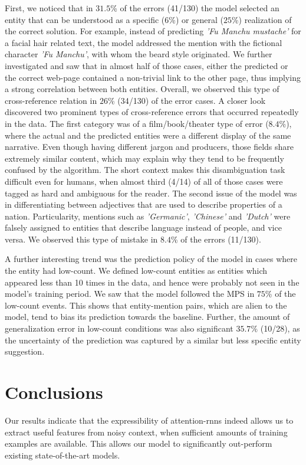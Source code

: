 \documentclass[11pt]{article}
\begin{document}
	First, we noticed that in $31.5$\% of the errors (41/130) the model selected an entity that can be understood as a specific ($6$\%) or general ($25$\%) realization of the correct solution. For example, instead of predicting \textit{'Fu Manchu mustache'} for a facial hair related text, the model addressed the mention with the fictional character \textit{'Fu Manchu'}, with whom the beard style originated. We further investigated and saw that in almost half of those cases, either the predicted or the correct web-page contained a non-trivial link to the other page, thus implying a strong correlation between both entities. Overall, we observed this type of cross-reference relation in $26$\% (34/130) of the error cases. A closer look discovered two prominent types of cross-reference errors that occurred repeatedly in the data. The first category was of a film/book/theater type of error ($8.4$\%), where the actual and the predicted entities were a different display of the same narrative. Even though having different jargon and producers, those fields share extremely similar content, which may explain why they tend to be frequently confused by the algorithm. The short context makes this disambiguation task difficult even for humans, when almost third (4/14) of all of those cases were tagged as hard and ambiguous for the reader. The second issue of the model was in differentiating between adjectives that are used to describe properties of a nation. Particularity, mentions such as \textit{'Germanic'}, \textit{'Chinese'} and \textit{'Dutch'} were falsely assigned to entities that describe language instead of people, and vice versa. We observed this type of mistake in $8.4$\% of the errors (11/130).
	
	A further interesting trend was the prediction policy of the model in cases where the entity had low-count. We defined low-count entities as entities which appeared less than 10 times in the data, and hence were probably not seen in the model's training period. We saw that the model followed the MPS in $75$\% of the low-count events. This shows that entity-mention pairs, which are alien to the model, tend to bias its prediction towards the baseline. Further, the amount of generalization error in low-count conditions was also significant $35.7\%$ (10/28), as the uncertainty of the prediction was captured by a similar but less specific entity suggestion.
	
	\section{Conclusions}
	Our results indicate that the expressibility of attention-rnns indeed allows us to extract useful features from noisy context, when sufficient amounts of training examples are available. This allows our model to significantly out-perform existing state-of-the-art models.
	
\end{document}
